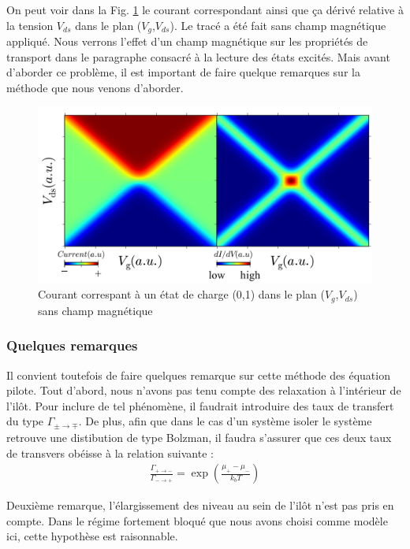 On peut voir dans la Fig. \ref{SimulatedCoulombMap} le courant correspondant ainsi que ça dérivé relative à la tension $V_{ds}$ dans le plan ($V_g$,$V_{ds}$). Le tracé a été fait sans champ magnétique appliqué. Nous verrons l'effet d'un champ magnétique sur les propriétés de transport dans le paragraphe consacré à la lecture des états excités. Mais avant d'aborder ce problème, il est important de faire quelque remarques sur la méthode que nous venons d'aborder.


\begin{figure}
\begin{center}
\includegraphics[scale=0.8]{Theorie/Transport/figure4/figure4.pdf} 
\caption{Courant correspant à un état de charge (0,1) dans le plan ($V_g$,$V_{ds}$) sans champ magnétique}
\label{SimulatedCoulombMap}
\end{center}
\end{figure}

\subsubsection{Quelques remarques}
Il convient toutefois de faire quelques remarque sur cette méthode des équation pilote. Tout d'abord, nous n'avons pas tenu compte des relaxation à l'intérieur de l'il\^ot. Pour inclure de tel phénomène, il faudrait introduire des taux de transfert du type $\Gamma_{\pm \rightarrow \mp}$. De plus, afin que dans le cas d'un système isoler le système retrouve une distibution de type Bolzman, il faudra s'assurer que ces deux taux de transvers obéisse à la relation suivante :
\begin{eqnarray}
\frac{\Gamma_{+ \rightarrow -}}{\Gamma_{- \rightarrow +}} = \exp(\frac{\mu_{+}- \mu_{-}}{k_bT}) \nonumber
\end{eqnarray}

Deuxième remarque, l'élargissement des niveau au sein de l'il\^ot n'est pas pris en compte. Dans le régime fortement bloqué que nous avons choisi comme modèle ici, cette hypothèse est raisonnable. 

